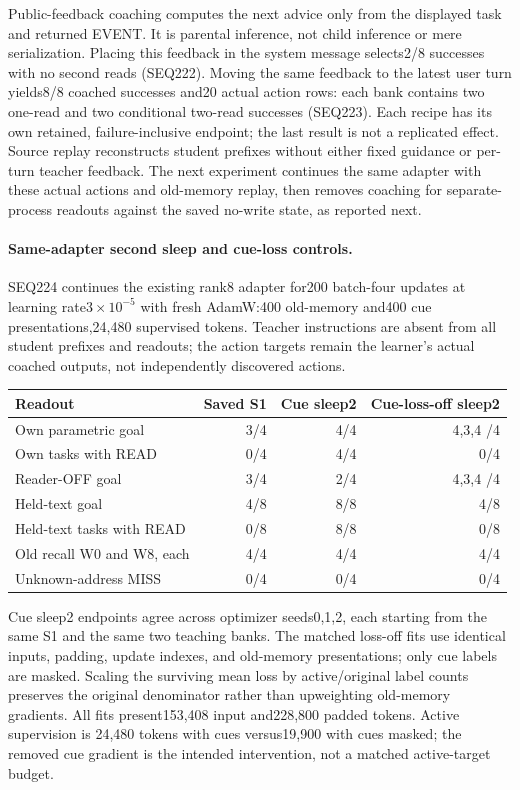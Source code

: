 \documentclass{article}
\begin{document}
Public-feedback coaching computes the next advice only from the displayed
task and returned EVENT. It is parental inference, not child inference or
mere serialization. Placing this feedback in the system message selects2/8
successes with no second reads (SEQ222). Moving the same feedback to the
latest user turn yields8/8 coached successes and20 actual action rows:
each bank contains two one-read and two conditional two-read successes
(SEQ223). Each recipe has its own retained, failure-inclusive endpoint;
the last result is not a replicated effect. Source replay reconstructs
student prefixes without either fixed guidance or per-turn teacher feedback.
The next experiment continues the same adapter with these actual actions and
old-memory replay, then removes coaching for separate-process readouts against
the saved no-write state, as reported next.

\paragraph{Same-adapter second sleep and cue-loss controls.}
SEQ224 continues the existing rank8 adapter for200 batch-four updates at
learning rate$3\times10^{-5}$ with fresh AdamW:400 old-memory and400 cue
presentations,24,480 supervised tokens. Teacher instructions are absent from
all student prefixes and readouts; the action targets remain the learner's
actual coached outputs, not independently discovered actions.
\begin{center}
\begin{tabular}{lrrr}
\toprule
Readout & Saved S1 & Cue sleep2 & Cue-loss-off sleep2 \\
\midrule
Own parametric goal &3/4&4/4&4,3,4 /4\\
Own tasks with READ &0/4&4/4&0/4\\
Reader-OFF goal &3/4&2/4&4,3,4 /4\\
Held-text goal &4/8&8/8&4/8\\
Held-text tasks with READ &0/8&8/8&0/8\\
Old recall W0 and W8, each &4/4&4/4&4/4\\
Unknown-address MISS &0/4&0/4&0/4\\
\bottomrule
\end{tabular}
\end{center}
Cue sleep2 endpoints agree across optimizer seeds0,1,2, each starting from the
same S1 and the same two teaching banks. The matched loss-off fits use identical
inputs, padding, update indexes, and old-memory presentations; only cue labels
are masked. Scaling the surviving mean loss by active/original label counts
preserves the original denominator rather than upweighting old-memory gradients.
All fits present153,408 input and228,800 padded tokens. Active supervision is
24,480 tokens with cues versus19,900 with cues masked; the removed cue gradient
is the intended intervention, not a matched active-target budget.
\end{document}
